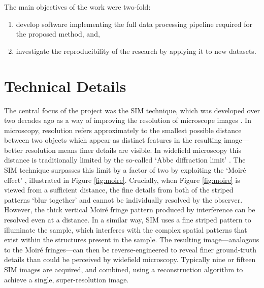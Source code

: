 \documentclass[12pt]{article}
\begin{document}
The main objectives of the work were two-fold:
\begin{enumerate}
    \item develop software implementing the full data processing pipeline required for the proposed method, and,
    \item investigate the reproducibility of the research by applying it to new datasets.
\end{enumerate}

\section*{Technical Details}

The central focus of the project was the SIM technique, which was developed over two decades ago
as a way of improving the resolution of microscope images \cite{SIM2000}.
In microscopy, resolution refers approximately to the smallest possible distance between two objects which appear as distinct features in the resulting image---better resolution means finer details are visible.
In widefield microscopy this distance is traditionally limited by the so-called `Abbe diffraction limit' \cite{abbe}.
The SIM technique surpasses this limit by a factor of two by exploiting the `Moir\'e effect' \cite{SIM2000},
illustrated in Figure \ref{fig:moire}.
Crucially, when Figure \ref{fig:moire} is viewed from a sufficient distance,
the fine details from both of the striped patterns `blur together' and cannot be individually resolved by the observer.
However, the thick vertical Moir\'e fringe pattern produced by interference can be resolved even at a distance.
In a similar way, SIM uses a fine striped pattern to illuminate the sample,
which interferes with the complex spatial patterns that exist within the structures present in the sample.
The resulting image---analogous to the Moir\'e fringes---can then be reverse-engineered
to reveal finer ground-truth details than could be perceived by widefield microscopy.
Typically nine or fifteen SIM images are acquired, and combined, using a reconstruction algorithm to achieve a single, super-resolution image.
\end{document}
